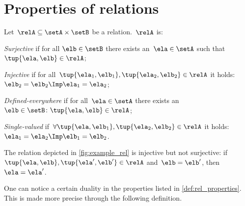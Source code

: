 

\section{Properties of relations}


\begin{definition}
  \label{def:rel_properties}
  Let~$\relA\subseteq \setA \times \setB$ be a relation.~$\relA$ is:
  \begin{compactenum}
    \item \emph{Surjective} if for all $\elb\in \setB$ there exists an~$\ela\in \setA$ such that~$\tup{\ela,\elb}\in \relA$;
    \item \emph{Injective} if for all~$ \tup{\ela_1,\elb_1},\tup{\ela_2,\elb_2}\in \relA$ it holds:~$\elb_2=\elb_2 \Imp \ela_1=\ela_2$;
    \item \emph{Defined-everywhere} if for all~$\ela\in \setA$ there exists an ~$\elb \in \setB\colon \tup{\ela,\elb}\in \relA$;
    \item \emph{Single-valued} if~$\forall \tup{\ela,\elb_1},\tup{\ela_2,\elb_2}\in \relA$ it holds:~$\ela_1=\ela_2\Imp \elb_1=\elb_2$.
  \end{compactenum}
\end{definition}

\begin{example}
  The relation depicted in \cref{fig:example_rel} is injective but not surjective: if~$\tup{\ela,\elb},\tup{\ela',\elb'}\in \relA$ and~$\elb=\elb'$, then~$\ela=\ela'$.
\end{example}

One can notice a certain duality in the properties listed in \cref{def:rel_properties}. This is made more precise through the following definition.

